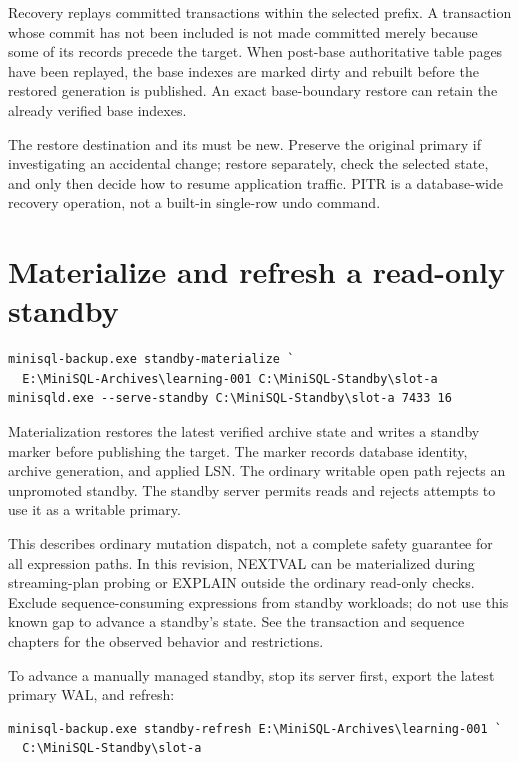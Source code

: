 Recovery replays committed transactions within the selected prefix. A
transaction whose commit has not been included is not made committed merely
because some of its records precede the target. When post-base authoritative
table pages have been replayed, the base indexes are marked dirty and rebuilt
before the restored generation is published. An exact base-boundary restore
can retain the already verified base indexes.

The restore destination and its  must be new. Preserve the
original primary if investigating an accidental change; restore separately,
check the selected state, and only then decide how to resume application
traffic. PITR is a database-wide recovery operation, not a built-in single-row
undo command.


\section{Materialize and refresh a read-only standby}

\begin{lstlisting}
minisql-backup.exe standby-materialize `
  E:\MiniSQL-Archives\learning-001 C:\MiniSQL-Standby\slot-a
minisqld.exe --serve-standby C:\MiniSQL-Standby\slot-a 7433 16
\end{lstlisting}

Materialization restores the latest verified archive state and writes a
standby marker before publishing the target. The marker records database
identity, archive generation, and applied LSN. The ordinary writable open path
rejects an unpromoted standby. The standby server permits reads and rejects
attempts to use it as a writable primary.

This describes ordinary mutation dispatch, not a complete safety guarantee for
all expression paths. In this revision, NEXTVAL can be materialized during
streaming-plan probing or EXPLAIN outside the ordinary read-only checks.
Exclude sequence-consuming expressions from standby workloads; do not use
this known gap to advance a standby's state. See the transaction and sequence
chapters for the observed behavior and restrictions.

To advance a manually managed standby, stop its server first, export the
latest primary WAL, and refresh:

\begin{lstlisting}
minisql-backup.exe standby-refresh E:\MiniSQL-Archives\learning-001 `
  C:\MiniSQL-Standby\slot-a
\end{lstlisting}

